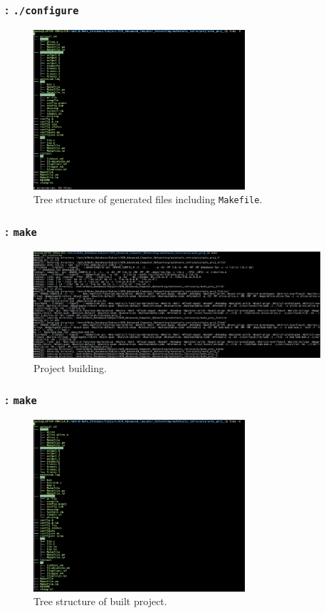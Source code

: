 \begin{frame}
    \frametitle{: \texttt{./configure}}

    \begin{figure}[H]
        \centering
        \includegraphics[width=0.7\textwidth]{../figure/autotool_5.png}
        \caption*{Tree structure of generated files including \texttt{Makefile}.}
    \end{figure}
\end{frame}

\begin{frame}
    \frametitle{: \texttt{make}}

    \begin{figure}[H]
        \centering
        \includegraphics[width=0.95\textwidth]{../figure/autotool_6.png}
        \caption*{Project building.}
    \end{figure}
\end{frame}

\begin{frame}
    \frametitle{: \texttt{make}}

    \begin{figure}[H]
        \centering
        \includegraphics[width=0.7\textwidth]{../figure/autotool_7.png}
        \caption*{Tree structure of built project.}
    \end{figure}
\end{frame}

